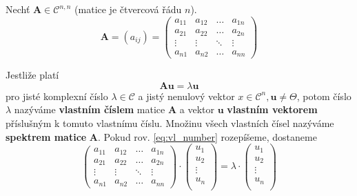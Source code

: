       \begin{definition} 
        Nechť \(\mathbf{A}\in \mathcal{C}^{n,n}\) (matice je čtvercová řádu \(n\)).
        \begin{equation}
          \mathbf{A} = (a_{ij}) =
            \begin{pmatrix}
              a_{11} & a_{12} & \ldots & a_{1n} \\
              a_{21} & a_{22} & \ldots & a_{2n} \\
              \vdots & \vdots & \ddots & \vdots \\
              a_{n1} & a_{n2} & \ldots & a_{nn}
            \end{pmatrix}
        \end{equation}

        Jestliže platí
        \begin{equation}\label{eq:vl_number}
          \mathbf{Au} = \lambda\mathbf{u}
        \end{equation}
        pro jisté komplexní číslo \(\lambda\in\mathcal{C}\)  a jistý nenulový vektor 
        \(x\in\mathcal{C}^n, \mathbf{u}\neq\Theta\), potom číslo \(\lambda\) nazýváme 
        \textbf{vlastním číslem} matice \(\mathbf{A}\) a vektor \(\mathbf{u}\) \textbf{vlastním 
        vektorem} příslušným k tomuto vlastnímu číslu. Množinu všech vlastních čísel nazýváme 
        \textbf{spektrem matice} \(\mathbf{A}\). Pokud rov. \ref{eq:vl_number} rozepíšeme, dostaneme
        \begin{equation}
          \begin{pmatrix}
            a_{11} & a_{12} & \ldots & a_{1n} \\
            a_{21} & a_{22} & \ldots & a_{2n} \\
            \vdots & \vdots & \ddots & \vdots \\
            a_{n1} & a_{n2} & \ldots & a_{nn}
          \end{pmatrix}   \cdot
          \begin{pmatrix}
            u_{1} \\  u_{2} \\ \vdots \\  u_{n} \\
          \end{pmatrix}    =\lambda\cdot
          \begin{pmatrix}
            u_{1} \\ u_{2} \\ \vdots \\ u_{n} \\

\end{pmatrix}
\end{equation}
\end{definition}
